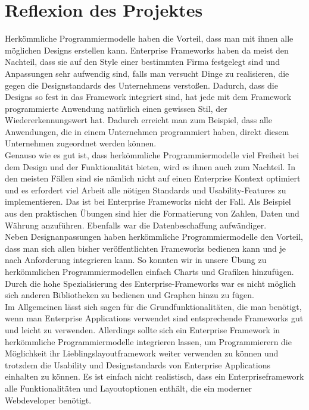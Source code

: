 \section{Reflexion des Projektes}
Herkömmliche Programmiermodelle haben die Vorteil, dass man mit ihnen alle möglichen Designs erstellen kann. Enterprise Frameworks haben da meist den Nachteil, dass sie auf den Style einer bestimmten Firma festgelegt sind und Anpassungen sehr aufwendig sind, falls man versucht Dinge zu realisieren, die gegen die Designstandards des Unternehmens verstoßen. Dadurch, dass die Designs so fest in das Framework integriert sind, hat jede mit dem Framework programmierte Anwendung natürlich einen gewissen Stil, der Wiedererkennungswert hat. Dadurch erreicht man zum Beispiel, dass alle Anwendungen, die in einem Unternehmen programmiert haben, direkt diesem Unternehmen zugeordnet werden können. 
\\
Genauso wie es gut ist, dass herkömmliche Programmiermodelle viel Freiheit bei dem Design und der Funktionalität bieten, wird es ihnen auch zum Nachteil. In den meisten Fällen sind sie nämlich nicht auf einen Enterprise Kontext optimiert und es erfordert viel Arbeit alle nötigen Standards und Usability-Features zu implementieren. Das ist bei Enterprise Frameworks nicht der Fall. Als Beispiel aus den praktischen Übungen sind hier die Formatierung von Zahlen, Daten und Währung anzuführen. Ebenfalls war die Datenbeschaffung aufwändiger.
\\
Neben Designanpassungen haben herkömmliche Programmiermodelle den Vorteil, dass man sich allen bisher veröffentlichten Frameworks bedienen kann und je nach Anforderung integrieren kann. So konnten wir in unsere Übung zu herkömmlichen Programmiermodellen einfach Charts und Grafiken hinzufügen. Durch die hohe Spezialisierung des Enterprise-Frameworks war es nicht möglich sich anderen Bibliotheken zu bedienen und Graphen hinzu zu fügen.
\\
Im Allgemeinen lässt sich sagen für die Grundfunktionalitäten, die man benötigt, wenn man Enterprise Applications verwendet sind entsprechende Frameworks gut und leicht zu verwenden. Allerdings sollte sich ein Enterprise Framework in herkömmliche Programmiermodelle integrieren lassen, um Programmierern die Möglichkeit ihr Lieblingslayoutframework weiter verwenden zu können und trotzdem die Usability und Designstandards von Enterprise Applications einhalten zu können. Es ist einfach nicht realistisch, dass ein Enterpriseframework alle Funktionalitäten und Layoutoptionen enthält, die ein moderner Webdeveloper benötigt.